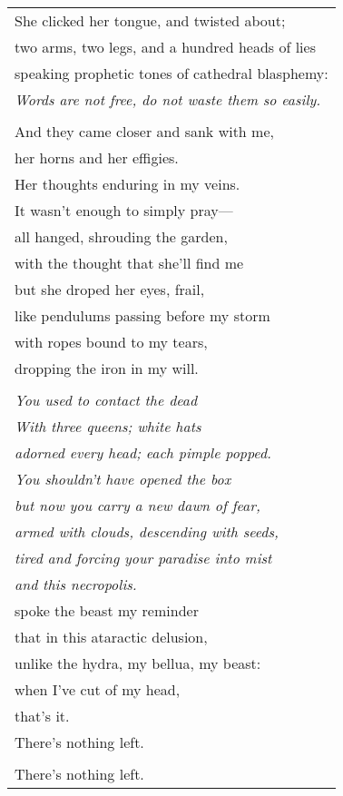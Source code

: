 \documentclass{article}
\begin{document}
\begin{center}
\begin{tabular}{l}
\\
She clicked her tongue, and twisted about; \\
two arms, two legs, and a hundred heads of lies \\
speaking prophetic tones of cathedral blasphemy: \\
\textit{Words are not free, do not waste them so easily.} \\
\\
And they came closer and sank with me, \\
her horns and her effigies. \\
Her thoughts enduring in my veins. \\
It wasn't enough to simply pray--- \\
all hanged, shrouding the garden, \\
with the thought that she'll find me \\
but she droped her eyes, frail, \\
like pendulums passing before my storm \\
with ropes bound to my tears, \\
dropping the iron in my will. \\
\\
\textit{You used to contact the dead} \\
\textit{With three queens; white hats} \\
\textit{adorned every head; each pimple popped.} \\
\textit{You shouldn't have opened the box} \\
\textit{but now you carry a new dawn of fear,} \\
\textit{armed with clouds, descending with seeds,} \\
\textit{tired and forcing your paradise into mist} \\
\textit{and this necropolis.} \\
spoke the beast my reminder \\
that in this ataractic delusion, \\
unlike the hydra, my bellua, my beast:\\
when I've cut of my head, \\
that's it. \\
There's nothing left. \\
\\
There's nothing left. \\
\end{tabular}
\end{center}
\end{document}
